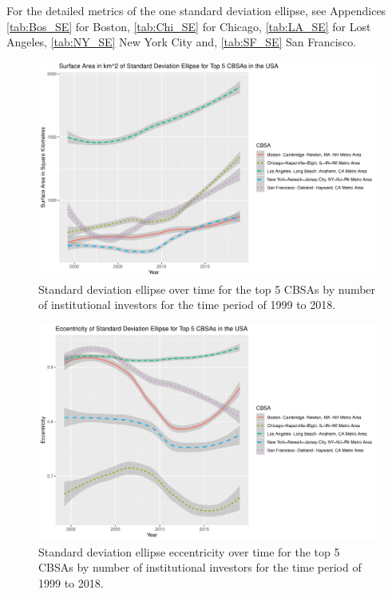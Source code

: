 For the detailed metrics of the one standard deviation ellipse, see Appendices \ref{tab:Bos_SE} for Boston, \ref{tab:Chi_SE} for Chicago, \ref{tab:LA_SE} for Lost Angeles, \ref{tab:NY_SE} New York City and, \ref{tab:SF_SE} San Francisco.  

\begin{figure}
	\centering
	\includegraphics[width=1\linewidth]{Figures/ChapterIII/Standard_Deviation_ellipse}
	\caption[Standard Deviation Ellipse]{Standard deviation ellipse over time for the top 5 CBSAs by number of institutional investors for the time period of 1999 to 2018.}
	\label{fig:standarddeviationellipse}
\end{figure}

\begin{figure}
	\centering
	\includegraphics[width=1\linewidth]{Figures/ChapterIII/Standard_Deviation_ellipse_Eccentricity}
	\caption[Standard Deviation Ellipse Eccentricity]{Standard deviation ellipse eccentricity over time for the top 5 CBSAs by number of institutional investors for the time period of 1999 to 2018.}
	\label{fig:Standard_Deviation_ellipse_Eccentricity}
\end{figure}


